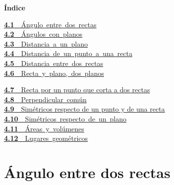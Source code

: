 \documentclass[11pt,a4paper]{article}
\begin{document}
\begin{tcolorbox}[colback=fmsurface,colframe=fmsurface,arc=3mm,left=4mm,right=4mm,top=2mm,bottom=2mm]
\small\textbf{Índice}\par\smallskip
\begin{minipage}[t]{0.49\linewidth}\small \mbox{\hyperlink{sec1}{\textbf{\color{fmgreen}4.1}\ \ Ángulo entre dos rectas}}\\[1pt]
\mbox{\hyperlink{sec2}{\textbf{\color{fmgreen}4.2}\ \ Ángulos con planos}}\\[1pt]
\mbox{\hyperlink{sec3}{\textbf{\color{fmgreen}4.3}\ \ Distancia a un plano}}\\[1pt]
\mbox{\hyperlink{sec4}{\textbf{\color{fmgreen}4.4}\ \ Distancia de un punto a una recta}}\\[1pt]
\mbox{\hyperlink{sec5}{\textbf{\color{fmgreen}4.5}\ \ Distancia entre dos rectas}}\\[1pt]
\mbox{\hyperlink{sec6}{\textbf{\color{fmgreen}4.6}\ \ Recta y plano, dos planos}}\\[3pt]\end{minipage}\hfill\begin{minipage}[t]{0.49\linewidth}\small \hyperlink{sec7}{\textbf{\color{fmgreen}4.7}\ \ Recta por un punto que corta a dos rectas}\\[3pt]
\mbox{\hyperlink{sec8}{\textbf{\color{fmgreen}4.8}\ \ Perpendicular común}}\\[1pt]
\hyperlink{sec9}{\textbf{\color{fmgreen}4.9}\ \ Simétricos respecto de un punto y de una recta}\\[3pt]
\mbox{\hyperlink{sec10}{\textbf{\color{fmgreen}4.10}\ \ Simétricos respecto de un plano}}\\[1pt]
\mbox{\hyperlink{sec11}{\textbf{\color{fmgreen}4.11}\ \ Áreas y volúmenes}}\\[1pt]
\mbox{\hyperlink{sec12}{\textbf{\color{fmgreen}4.12}\ \ Lugares geométricos}}\\[3pt]\end{minipage}
\end{tcolorbox}

\section{Ángulo entre dos rectas}\hypertarget{sec1}{}
\end{document}
